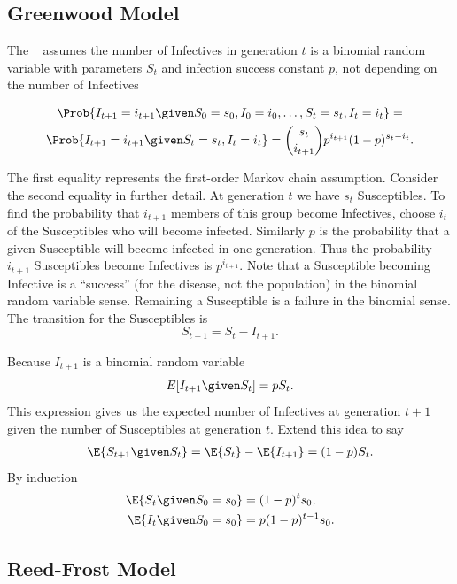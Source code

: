 \documentclass[12pt]{article}
\begin{document}
\subsection*{Greenwood Model}

The  ~%
assumes the number of Infectives in generation \( t \) is a binomial
random variable with parameters \( S_t \) and infection success constant
\( p \), not depending on the number of Infectives

\begin{multline*}
    \Prob{I_{t+1}=i_{t+1} \given S_0=s_0, I_0=i_0, \ldots,S_t=s_t, I_t=i_t}
    = \\
    \Prob{I_{t+1}=i_{t+1} \given S_t=s_t, I_t=i_t} = \binom{s_t}{i_{t+1}}p^
    {i_{t+1}}(1-p)^{s_t-i_t}.
\end{multline*}

The first equality represents the first-order Markov chain assumption.
Consider the second equality in further detail.  At generation \( t \)
we have \( s_t \) Susceptibles.  To find the probability that \( i_{t+1}
\) members of this group become Infectives,  choose  \( i_{t} \)
of the Susceptibles who will become infected. Similarly \( p \) is the
probability that a given Susceptible will become infected in one
generation.  Thus the probability \( i_{t+1} \) Susceptibles become
Infectives is \( p^{i_{t+1}} \). Note that a Susceptible becoming
Infective is a ``success'' (for the disease, not the population) in the
binomial random variable sense.  Remaining a Susceptible is a failure in
the binomial sense.  The transition for the Susceptibles is
\[
    S_{t+1} = S_t - I_{t+1}.
\]

Because \( I_{t+1} \) is a binomial random variable
\[
    E[I_{t+1} \given S_t]= p S_t.
\] This expression gives us the expected number of Infectives at
generation \( t+1 \) given the number of Susceptibles at generation \( t
\).  Extend this idea to say
\begin{align*}
    \E{S_{t+1} \given S_t } = \E{S_t} - \E{I_{t+1}} = (1-p) S_t.
\end{align*}
By induction
\begin{align*}
    \E{S_t \given S_0= s_0} &= (1-p)^t s_0, \\
    \E{I_t \given S_0= s_0} &= p(1-p)^{t-1} s_{0}.
\end{align*}

\subsection*{Reed-Frost Model}
\end{document}
